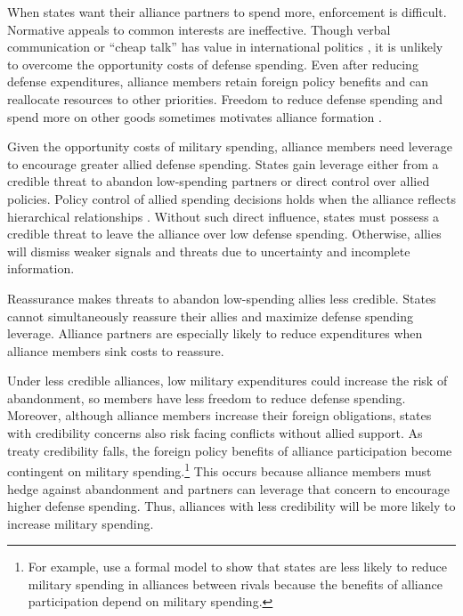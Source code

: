 \documentclass[12pt]{article}
\begin{document}
When states want their alliance partners to spend more, enforcement is difficult. 
Normative appeals to common interests are ineffective. 
Though verbal communication or ``cheap talk'' has value in international politics \citep{Trager2010}, it is unlikely to overcome the opportunity costs of defense spending. 
Even after reducing defense expenditures, alliance members retain foreign policy benefits and can reallocate resources to other priorities. 
Freedom to reduce defense spending and spend more on other goods sometimes motivates alliance formation \citep{Kimball2010, AllenDigiuseppe2013}. 


Given the opportunity costs of military spending, alliance members need leverage to encourage greater allied defense spending. 
States gain leverage either from a credible threat to abandon low-spending partners or direct control over allied policies. 
Policy control of allied spending decisions holds when the alliance reflects hierarchical relationships \citep{Lake1996}. 
Without such direct influence, states must possess a credible threat to leave the alliance over low defense spending. 
Otherwise, allies will dismiss weaker signals and threats due to uncertainty and incomplete information. 


Reassurance makes threats to abandon low-spending allies less credible. 
States cannot simultaneously reassure their allies and maximize defense spending leverage. 
Alliance partners are especially likely to reduce expenditures when alliance members sink costs to reassure. 


Under less credible alliances, low military expenditures could increase the risk of abandonment, so members have less freedom to reduce defense spending. 
Moreover, although alliance members increase their foreign obligations, states with credibility concerns also risk facing conflicts without allied support. 
As treaty credibility falls, the foreign policy benefits of alliance participation become contingent on military spending.\footnote{For example, \citep{NiouZeigler2019} use a formal model to show that states are less likely to reduce military spending in alliances between rivals because the benefits of alliance participation depend on military spending.} 
This occurs because alliance members must hedge against abandonment and partners can leverage that concern to encourage higher defense spending.
Thus, alliances with less credibility will be more likely to increase military spending. 
\end{document}
